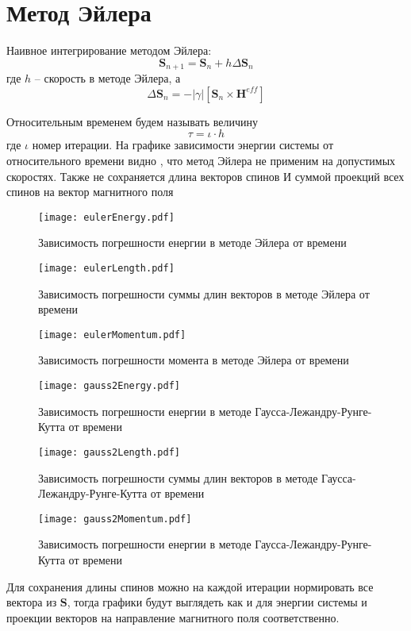 \section{Метод Эйлера}\label{sec:euler}
Наивное интегрирование методом Эйлера:
\begin{equation}
    \mathbf S_{n+1} = \mathbf S_{n} + h\Delta{\mathbf S_n}
\end{equation}
где $h$ -- скорость в методе Эйлера, а
\begin{equation}
    \Delta{\mathbf S_n} = -|\gamma|\left[\mathbf S_n \times \mathbf H^{eff}\right]
\end{equation}

Относительным временем будем называть величину
\begin{equation}
    \tau = \iota \cdot h
\end{equation}
где $\iota$ номер итерации.
На графике зависимости энергии системы от относительного времени видно
, что метод
Эйлера не применим на допустимых скоростях.
Также не сохраняется длина векторов спинов
И суммой проекций всех спинов на вектор магнитного поля

\begin{figure}[p]
    \centering
    \texttt{[image: eulerEnergy.pdf]}
    \caption{Зависимость погрешности енергии в методе Эйлера от времени}
\end{figure}
\begin{figure}[p]
    \centering
    \texttt{[image: eulerLength.pdf]}
    \caption{Зависимость погрешности суммы длин векторов в методе Эйлера от
    времени}
\end{figure}
\begin{figure}[p]
    \centering
    \texttt{[image: eulerMomentum.pdf]}
    \caption{Зависимость погрешности момента в методе Эйлера от времени}
\end{figure}
\begin{figure}[p]
    \centering
    \texttt{[image: gauss2Energy.pdf]}
    \caption{Зависимость погрешности енергии в методе
    Гаусса-Лежандру-Рунге-Кутта от времени}
\end{figure}
\begin{figure}[p]
    \centering
    \texttt{[image: gauss2Length.pdf]}
    \caption{Зависимость погрешности суммы длин векторов в методе
    Гаусса-Лежандру-Рунге-Кутта от времени}
\end{figure}
\begin{figure}[p]
    \centering
    \texttt{[image: gauss2Momentum.pdf]}
    \caption{Зависимость погрешности енергии в методе
    Гаусса-Лежандру-Рунге-Кутта от времени}
\end{figure}


Для сохранения длины спинов можно на каждой итерации нормировать все вектора из
$\mathbf S$, тогда графики будут выглядеть как  и
 для энергии системы и проекции векторов на
направление магнитного поля соответственно.
